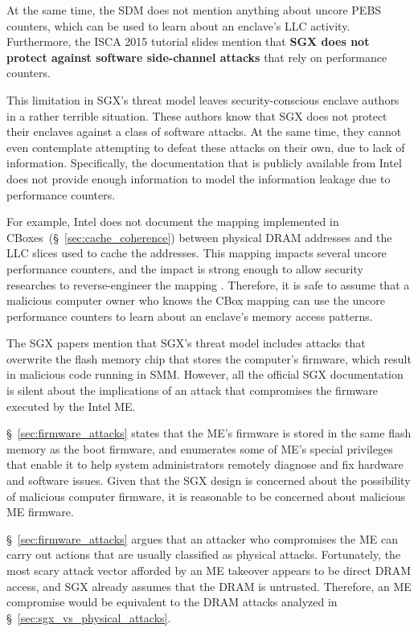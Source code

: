 At the same time, the SDM does not mention anything about uncore PEBS counters,
which can be used to learn about an enclave's LLC activity. Furthermore, the
ISCA 2015 tutorial slides mention that \textbf{SGX does not protect against
software side-channel attacks} that rely on performance counters.

This limitation in SGX's threat model leaves security-conscious enclave authors
in a rather terrible situation. These authors know that SGX does not protect
their enclaves against a class of software attacks. At the same time, they
cannot even contemplate attempting to defeat these attacks on their own, due to
lack of information. Specifically, the documentation that is publicly available
from Intel does not provide enough information to model the information leakage
due to performance counters.

For example, Intel does not document the mapping implemented in
CBoxes~(\S~\ref{sec:cache_coherence}) between physical DRAM addresses and the
LLC slices used to cache the addresses. This mapping impacts several uncore
performance counters, and the impact is strong enough to allow security
researches to reverse-engineer the mapping \cite{inci2015rsachannel,
maurice2015intelhash, yarom2015intelhash}. Therefore, it is safe to assume that
a malicious computer owner who knows the CBox mapping can use the uncore
performance counters to learn about an enclave's memory access patterns.

The SGX papers mention that SGX's threat model includes attacks that overwrite
the flash memory chip that stores the computer's firmware, which result in
malicious code running in SMM.  However, all the official SGX documentation is
silent about the implications of an attack that compromises the firmware
executed by the Intel ME.

\S~\ref{sec:firmware_attacks} states that the ME's firmware is stored in the
same flash memory as the boot firmware, and enumerates some of ME's special
privileges that enable it to help system administrators remotely diagnose and
fix hardware and software issues. Given that the SGX design is concerned about
the possibility of malicious computer firmware, it is reasonable to be
concerned about malicious ME firmware.

\S~\ref{sec:firmware_attacks} argues that an attacker who compromises the ME
can carry out actions that are usually classified as physical attacks.
Fortunately, the most scary attack vector afforded by an ME takeover appears to
be direct DRAM access, and SGX already assumes that the DRAM is untrusted.
Therefore, an ME compromise would be equivalent to the DRAM attacks analyzed in
\S~\ref{sec:sgx_vs_physical_attacks}.


